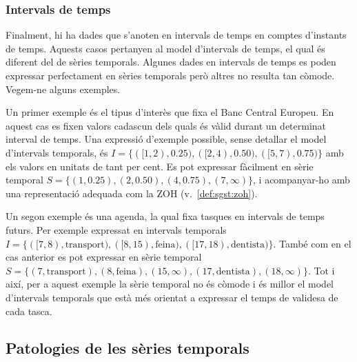 \subsubsection{Intervals de temps}

Finalment, hi ha dades que s'anoten en intervals de temps en comptes
d'instants de temps. Aquests casos pertanyen al model d'intervals de
temps, el qual és diferent del de sèries temporals. Algunes dades en
intervals de temps es poden expressar perfectament en sèries temporals
però altres no resulta tan còmode. Vegem-ne alguns exemples.


Un primer exemple és el tipus d'interès que fixa el Banc Central
Europeu. En aquest cas es fixen valors cadascun dels quals és vàlid
durant un determinat interval de temps. Una expressió d'exemple
possible, sense detallar el model d'intervals temporals, és
$I=\{([1,2),0.25),([2,4),0.50),([5,7),0.75)\}$ amb els valors en
unitats de tant per cent. Es pot expressar fàcilment en sèrie temporal
$S=\{(1,0.25),(2,0.50),(4,0.75),(7,\infty)\}$, i acompanyar-ho amb una
representació adequada com la ZOH (v.~\autoref{def:sgst:zoh}).


Un segon exemple és una agenda, la qual fixa tasques en intervals de
temps futurs. Per exemple expressat en intervals temporals
$I=\{([7,8),\text{transport}),([8,15),\text{feina}),([17,18),
\text{dentista})\}$. També com en el cas anterior es pot expressar en
sèrie temporal $S=\{(7,\text{transport}),(8,\text{feina}), (15,\infty)
,(17,\text{dentista}), (18,\infty)\}$. Tot i així, per a aquest
exemple la sèrie temporal no és còmode i és millor el model
d'intervals temporals que està més orientat a expressar
el temps de validesa de cada tasca.









\subsection{Patologies de les sèries temporals}

